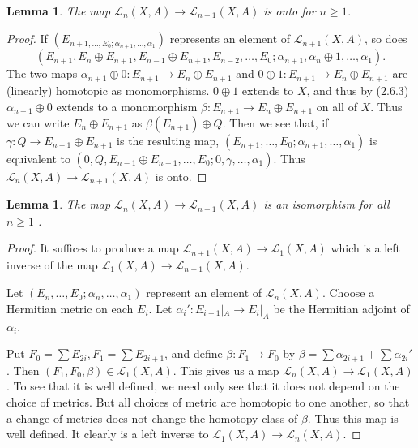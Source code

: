 \documentclass[leqno]{book}
\numberwithin{equation}{section}
\newtheorem{lemma}[theorem]{Lemma}
\theoremstyle{definition}
\begin{document}
            \begin{lemma}
              The map $\mathcal{L}_{n}(X,A)\to \mathcal{L}_{n+1}(X,A)$ is onto for $n\ge 1$.
            \end{lemma}

            \begin{proof}
              If $(E_{n+1, \ldots ,E_0;\alpha _{n+1}, \ldots ,\alpha_1})$ represents an element of $\mathcal{L}_{n+1}(X,A)$, so does
              \begin{equation*}
                (E_{n+1},E_{n}\oplus E_{n+1},E_{n-1}\oplus E_{n+1}, E_{n-2}, \ldots ,E_0; \alpha _{n+1}, \alpha _{n}\oplus 1, \ldots , \alpha_1).
              \end{equation*}
              The two maps $\alpha _{n+1}\oplus 0:E_{n+1}\to E_{n}\oplus E_{n+1}$ and $0 \oplus 1:E_{n+1}\to E_{n}\oplus  E_{n+1}$ are (linearly) homotopic as monomorphisms. $0\oplus 1$ extends to $X$, and thus by (2.6.3) $\alpha _{n+1}\oplus 0$ extends to a monomorphism $\beta: E_{n+1}\to E_{n}\oplus E_{n+1}$ on all of $X$. Thus we can write $E_{n}\oplus E_{n+1}$ as $\beta(E_{n+1})\oplus Q$. Then we see that, if $\gamma: Q\to E_{n-1}\oplus E_{n+1}$ is the resulting map, $(E_{n+1}, \ldots ,E_0; \alpha _{n+1}, \ldots ,\alpha_1)$ is equivalent to $(0,Q,E_{n-1}\oplus E_{n+1}, \ldots ,E_0;0,\gamma, \ldots ,\alpha_1)$. Thus $\mathcal{L}_{n}(X,A)\to \mathcal{L}_{n+1}(X,A)$ is onto.
            \end{proof}

            \begin{lemma}
              The map $\mathcal{L}_{n}(X,A)\to \mathcal{L}_{n+1}(X,A)$ is an isomorphism for all $n\ge 1$ .
            \end{lemma}

            \begin{proof}
              It suffices to produce a map $\mathcal{L}_{n+1}(X,A)\to \mathcal{L}_{1}(X,A)$ which is a left inverse of the map $\mathcal{L}_{1}(X,A)\to \mathcal{L}_{n+1}(X,A)$.

              Let $(E_{n}, \ldots ,E_0;\alpha _{n}, \ldots ,\alpha_1)$ represent an element of $\mathcal{L}_{n}(X,A)$. Choose a Hermitian metric on each $E_{i}$. Let $\alpha _{i}':E_{i-1}|_{A}\to E_{i}|_{A}$ be the Hermitian adjoint of $\alpha _{i}$.

              Put $F_0=\sum E_{2i}, F_1=\sum E_{2i+1}$, and define $\beta:F_1\to F_0$ by $\beta =\sum \alpha _{2i+1}+ \sum \alpha _{2i}'$. Then $(F_1,F_0,\beta)\in \mathcal{L}_{1}(X,A)$. This gives us a map $\mathcal{L}_{n}(X,A)\to \mathcal{L}_{1}(X,A)$. To see that it is well defined, we need only see that it does not depend on the choice of metrics. But all choices of metric are homotopic to one another, so that a change of metrics does not change the homotopy class of $\beta$. Thus this map is well defined. It clearly is a left inverse to $\mathcal{L}_{1}(X,A)\to \mathcal{L}_{n}(X,A)$.
            \end{proof}
\end{document}
